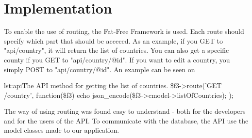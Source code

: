 \section{Implementation}
To enable the use of routing, the Fat-Free Framework is used. 
Each route should specify which part that should be acceced. As an example, if you GET to "api/country", it will return the list of countries. You can also get a specific county if you GET to "api/country/@id". If you want to edit a country, you simply POST to "api/country/@id".
An example can be seen on 
\begin{code}{lst:api}{The API method for getting the list of countries.}
\$f3->route('GET /country',
    function(\$f3) {
        echo json_encode(\$f3->cmodel->listOfCountries);
    }
);
\end{code}

The way of using routing was found easy to understand - both for the developers and for the users of the API. 
To communicate with the database, the API use the model classes made to our application.